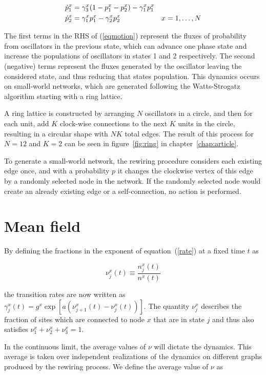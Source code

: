 \begin{align}
    \dot{p}^x_1 &= \gamma^x_3(1 - p^x_1 - p^x_2) - \gamma^x_1 p^x_1 & \notag\\
    \dot{p}^x_2 &= \gamma^x_1p^x_1 - \gamma^x_2 p^x_2 &x=1,\dots,N
    \label{eqmotion}
\end{align}

\noindent The first terms in the RHS of (\ref{eqmotion}) represent the fluxes of probability from oscillators in the previous state,
which can advance one phase state and increase the populations of oscillators in states 1 and 2 respectively. The second (negative)
terms represent the fluxes generated by the oscillator leaving the considered state, and thus reducing that states population.  This
dynamics occurs on small-world networks, which are generated following the Watts-Strogatz algorithm starting with a ring lattice.

A ring lattice is constructed by arranging $N$ oscillators in a circle, and then for each unit, add $K$ clock-wise connections to the
next $K$ units in the circle, resulting in a circular shape with $NK$ total edges. The result of this process for $N=12$ and $K=2$ can
be seen in figure~\ref{fig:ring} in chapter~\ref{chap:article}.

To generate a small-world network, the rewiring procedure considers each existing edge once, and with a probability $p$ it changes the
clockwise vertex of this edge by a randomly selected node in the network. If the randomly selected node would create an already
existing edge or a self-connection, no action is performed.

\section{Mean field}

By defining the fractions in the exponent of equation~(\ref{rate}) at a fixed time $t$ as

\begin{equation}
    \nu^x_j(t) \equiv \frac{n^x_j(t)}{n^x(t)}
\end{equation}

\noindent the transition rates are now written as $\gamma^x_j(t) = g^x\exp\left[ a(\nu^x_{j+1}(t) - \nu^x_j(t)) \right]$. The quantity $\nu^x_j$
describes the fraction of sites which are connected to node $x$ that are in state $j$ and thus also satisfies
$\nu^x_1+\nu^x_2+\nu^x_3=1$.

In the continuous limit, the average values of $\nu$ will dictate the dynamics. This average is taken over independent realizations of
the dynamics on different graphs produced by the rewiring process. We define the average value of $\nu$ as

